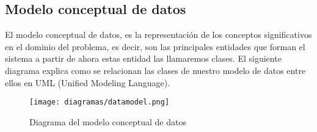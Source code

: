 \subsection{Modelo conceptual de datos}
\label{sec:smodelo_conceptual_datos}
El modelo conceptual de datos, es la representación de los conceptos significativos en el dominio del problema, es decir, son las principales entidades que forman el sistema a partir de ahora estas entidad las llamaremos clases.
El siguiente diagrama explica como se relacionan las clases de nuestro modelo de datos entre ellos en UML (Unified Modeling Language).
\begin{figure}[ht!]
\center
\texttt{[image: diagramas/datamodel.png]}
\caption{Diagrama del modelo conceptual de datos}
\label{fig:data_model}
\end{figure}

